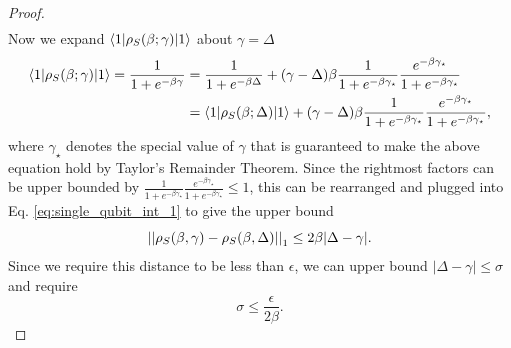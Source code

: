 \begin{proof}
\begin{align}
 \end{align}
    Now we expand $\langle 1| \rho_S(\beta; \gamma) |1\rangle$ about $\gamma = \Delta$
    \begin{align}
    \langle 1| \rho_S(\beta; \gamma) |1\rangle = \frac{1}{1 + e^{-\beta \gamma}} &= \frac{1}{1 + e^{-\beta \Delta}} + (\gamma - \Delta) \beta \frac{1}{1 + e^{-\beta \gamma_{\star}}} \frac{e^{-\beta \gamma_{\star}}}{1 + e^{-\beta \gamma_{\star}}} \\
    &= \langle 1| \rho_S(\beta; \Delta) |1\rangle + (\gamma - \Delta) \beta \frac{1}{1 + e^{-\beta \gamma_{\star}}} \frac{e^{-\beta \gamma_{\star}}}{1 + e^{-\beta \gamma_{\star}}},
    \end{align}
    where $\gamma_{\star}$ denotes the special value of $\gamma$ that is guaranteed to make the above equation hold by Taylor's Remainder Theorem.
    Since the rightmost factors can be upper bounded by $\frac{1}{1 + e^{-\beta \gamma_{\star}}} \frac{e^{-\beta \gamma_{\star}}}{1 + e^{-\beta \gamma_{\star}}} \le 1$, this can be rearranged and plugged into Eq. \eqref{eq:single_qubit_int_1} to give the upper bound
 \begin{equation}
 \left| \left| \rho_S(\beta, \gamma) - \rho_S(\beta, \Delta) \right| \right|_1 \le 2 \beta |\Delta - \gamma|.
 \end{equation}
Since we require this distance to be less than $\epsilon$, we can upper bound $|\Delta - \gamma| \le \sigma$ and require
\begin{equation}
    \sigma \le \frac{\epsilon}{2 \beta}. \label{eq:single_qubit_ineq_1}
\end{equation}


\end{proof}
